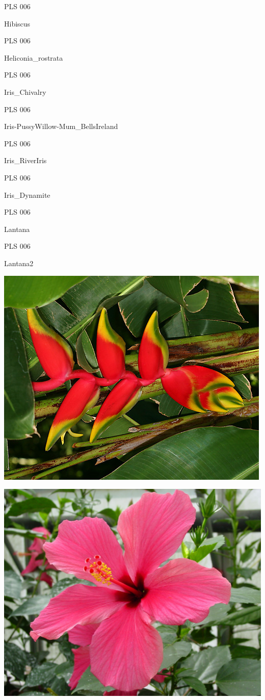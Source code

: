 \documentclass{article}
\begin{document}
\noindent  PLS 006
\vfill
\centerline{{\huge Hibiscus }}
\vfill
\newpage

\noindent  PLS 006
\vfill
\centerline{{\huge Heliconia\_rostrata }}
\vfill
\newpage

\noindent  PLS 006
\vfill
\centerline{{\huge Iris\_Chivalry }}
\vfill
\newpage

\noindent  PLS 006
\vfill
\centerline{{\huge Iris-PussyWillow-Mum\_BellsIreland }}
\vfill
\newpage

\noindent  PLS 006
\vfill
\centerline{{\huge Iris\_RiverIris }}
\vfill
\newpage

\noindent  PLS 006
\vfill
\centerline{{\huge Iris\_Dynamite }}
\vfill
\newpage

\noindent  PLS 006
\vfill
\centerline{{\huge Lantana }}
\vfill
\newpage

\noindent  PLS 006
\vfill
\centerline{{\huge Lantana2 }}
\vfill
\newpage

\begin{center}
\includegraphics[height=0.925\paperheight]{../Heliconia_rostrata.jpg}
\end{center}
\newpage

\begin{center}
\includegraphics[height=0.925\paperheight]{../Hibiscus.jpg}
\end{center}
\newpage
\end{document}
